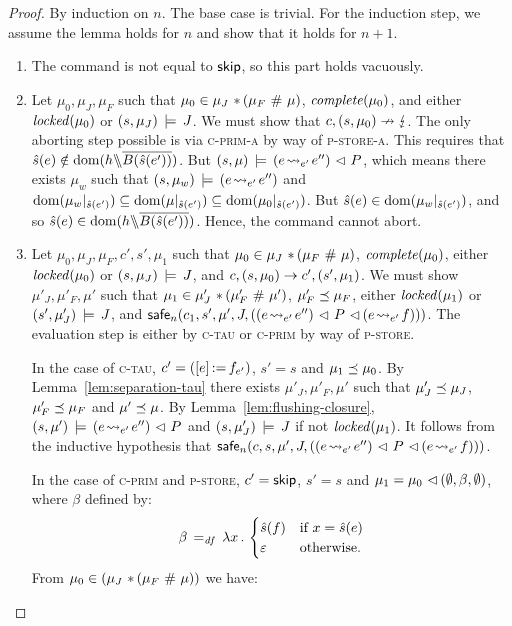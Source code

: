 \documentclass[11pt]{report}
\begin{document}
\begin{proof}
    By induction on $n$. The base case is trivial. For the induction step, we assume the lemma holds for $n$ and show that it holds for $n+1$.

    \begin{enumerate}
        \item The command is not equal to $\operatorname{\mathsf{skip}}$, so this part holds vacuously. 

        \item Let $\mu_0,\mu_J,\mu_F$ such that $\mu_0 \in \mu_J \operatorname{\,\ast\,} (\mu_F \operatorname{\,\#\,} \mu)$, $\mathit{complete}(\mu_0)$, and either $\mathit{locked}(\mu_0)$ or $(s,\mu_J) \,\models\, J$. We must show that $c,(s,\mu_0) \nrightarrow \lightning$. The only aborting step possible is via \textsc{c-prim-a} by way of \textsc{p-store-a}. This requires that $\hat{s}(e) \notin \operatorname{\mathrm{dom}}(h \backslash\!\!\backslash \overline{B(\hat{s}(e'))})$. But $(s,\mu) \,\models\, (e \!\leadsto_{e'}\! e'') \operatorname{\,\vartriangleleft\,} P$, which means there exists $\mu_w$ such that $(s,\mu_w) \,\models\, (e \!\leadsto_{e'}\! e'')$ and $\operatorname{\mathrm{dom}}(\mu_w |_{\hat{s}(e')}) \subseteq \operatorname{\mathrm{dom}}(\mu |_{\hat{s}(e')}) \subseteq \operatorname{\mathrm{dom}}(\mu_0 |_{\hat{s}(e')})$. But $\hat{s}(e) \in \operatorname{\mathrm{dom}}(\mu_w |_{\hat{s}(e')})$, and so $\hat{s}(e) \in \operatorname{\mathrm{dom}}(h \backslash\!\!\backslash \overline{B(\hat{s}(e'))})$. Hence, the command cannot abort.

        \item Let $\mu_0,\mu_J,\mu_F,c',s',\mu_1$ such that $\mu_0 \in \mu_J \operatorname{\,\ast\,} (\mu_F \operatorname{\,\#\,} \mu)$, $\mathit{complete}(\mu_0)$, either $\mathit{locked}(\mu_0)$ or $(s,\mu_J) \,\models\, J$, and $c,(s,\mu_0) \rightarrow c',(s',\mu_1)$. We must show $\mu'_J,\mu'_F,\mu'$ such that $\mu_1 \in \mu'_J \operatorname{\,\ast\,} (\mu'_F \operatorname{\,\#\,} \mu')$, $\mu'_F \preceq \mu_F$, either $\mathit{locked}(\mu_1)$ or $(s',\mu'_J) \,\models\, J$, and $\mathsf{safe}_{n}(c_1,s',\mu',J,\left((e \!\leadsto_{e'}\! e'') \operatorname{\,\vartriangleleft\,} P \operatorname{\,\vartriangleleft\,} (e \!\leadsto_{e'}\! f)\right))$. The evaluation step is either by \textsc{c-tau} or \textsc{c-prim} by way of \textsc{p-store}. 

        In the case of \textsc{c-tau}, $c' = (\left[ e \right] \operatorname{:\!=} f_{e'})$, $s' = s$ and $\mu_1 \preceq \mu_0$. By Lemma~\ref{lem:separation-tau} there exists $\mu'_J,\mu'_F,\mu'$ such that $\mu'_J \preceq \mu_J$, $\mu'_F \preceq \mu_F$ and $\mu' \preceq \mu$. By Lemma~\ref{lem:flushing-closure}, $(s,\mu') \,\models\, (e \!\leadsto_{e'}\! e'') \operatorname{\,\vartriangleleft\,} P$ and $(s,\mu'_J) \,\models\, J$ if not $\mathit{locked}(\mu_1)$. It follows from the inductive hypothesis that $\mathsf{safe}_{n}(c,s,\mu',J,((e \!\leadsto_{e'}\! e'') \operatorname{\,\vartriangleleft\,} P \operatorname{\,\vartriangleleft\,} (e \!\leadsto_{e'}\! f)))$. 

        In the case of \textsc{c-prim} and \textsc{p-store}, $c' = \operatorname{\mathsf{skip}}$, $s' = s$ and $\mu_1 = \mu_0 \operatorname{\,\vartriangleleft\,} (\operatorname{\emptyset},\beta,\operatorname{\emptyset})$, where $\beta$ defined by: \[ \beta \operatorname{\;=_{\mathit{df}}\;} \lambda x\,.\, \begin{cases}
          \hat{s}(f) & \text{if $x = \hat{s}(e)$} \\ 
          \varepsilon & \text{otherwise.}
        \end{cases}\] From $\mu_0 \in (\mu_J \operatorname{\,\ast\,} (\mu_F \operatorname{\,\#\,} \mu))$ we have:        
        \Calc{ 

}
\end{enumerate}
\end{proof}
\end{document}
